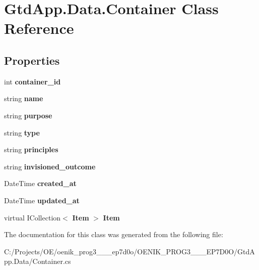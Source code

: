 \section{Gtd\+App.\+Data.\+Container Class Reference}
\label{class_gtd_app_1_1_data_1_1_container}
\subsection*{Properties}
\begin{DoxyCompactItemize}
\item 
\mbox{\label{class_gtd_app_1_1_data_1_1_container_a4cb0c959b54c02d9710d3c41746d0197}} 
int {\bfseries container\+\_\+id}\hspace{0.3cm}{\ttfamily  [get, set]}
\item 
\mbox{\label{class_gtd_app_1_1_data_1_1_container_aaa1f25d81d743cea16163c41c980bc44}} 
string {\bfseries name}\hspace{0.3cm}{\ttfamily  [get, set]}
\item 
\mbox{\label{class_gtd_app_1_1_data_1_1_container_a01a62a92a5c68157125755a34a508884}} 
string {\bfseries purpose}\hspace{0.3cm}{\ttfamily  [get, set]}
\item 
\mbox{\label{class_gtd_app_1_1_data_1_1_container_ae645b9756bc6f7dbeb899aa9f0dfd10e}} 
string {\bfseries type}\hspace{0.3cm}{\ttfamily  [get, set]}
\item 
\mbox{\label{class_gtd_app_1_1_data_1_1_container_ae0091f147c3c9c00150ffbe36fff8ee9}} 
string {\bfseries principles}\hspace{0.3cm}{\ttfamily  [get, set]}
\item 
\mbox{\label{class_gtd_app_1_1_data_1_1_container_a9694c2ca9af108232ba0aa67f996f4ce}} 
string {\bfseries invisioned\+\_\+outcome}\hspace{0.3cm}{\ttfamily  [get, set]}
\item 
\mbox{\label{class_gtd_app_1_1_data_1_1_container_af618b3b318befa872633ef3a2cb91978}} 
Date\+Time {\bfseries created\+\_\+at}\hspace{0.3cm}{\ttfamily  [get, set]}
\item 
\mbox{\label{class_gtd_app_1_1_data_1_1_container_a04ea75257f82e9d1e913ce42e05e3bab}} 
Date\+Time {\bfseries updated\+\_\+at}\hspace{0.3cm}{\ttfamily  [get, set]}
\item 
\mbox{\label{class_gtd_app_1_1_data_1_1_container_adb3e31a325d99e9f5b8440fc5fc67815}} 
virtual I\+Collection$<$ \textbf{ Item} $>$ {\bfseries Item}\hspace{0.3cm}{\ttfamily  [get, set]}
\end{DoxyCompactItemize}


The documentation for this class was generated from the following file\+:\begin{DoxyCompactItemize}
\item 
C\+:/\+Projects/\+O\+E/oenik\+\_\+prog3\+\_\+\_\+\_\+ep7d0o/\+O\+E\+N\+I\+K\+\_\+\+P\+R\+O\+G3\+\_\+\_\+\_\+\+E\+P7\+D0\+O/\+Gtd\+App.\+Data/Container.\+cs\end{DoxyCompactItemize}
